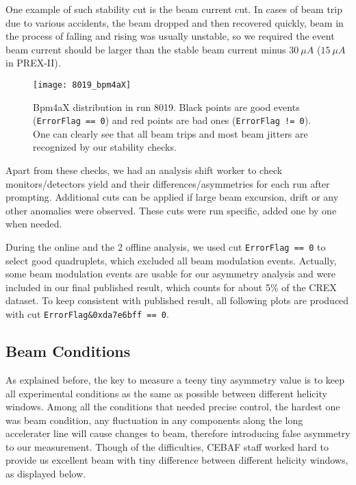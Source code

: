 One example of such stability cut is the beam current cut. In cases of beam trip
due to various accidents, the beam dropped and then recovered quickly, beam in
the process of falling and rising was usually unstable, so we required the event
beam current should be larger than the stable beam current minus $30\ \mu A$ ($15\ \mu A$ in PREX-II).

\begin{figure}[!h]
    \centering
    \texttt{[image: 8019\_bpm4aX]}
    \caption{Bpm4aX distribution in run 8019. Black points are good
    events (\texttt{ErrorFlag == 0}) and red points are bad ones (\texttt{ErrorFlag != 0}). 
    One can clearly see that all beam trips and most beam jitters are recognized 
    by our stability checks.}
\end{figure}

Apart from these checks, we had an analysis shift worker to check monitors/detectors 
yield and their differences/asymmetries for each run after prompting. Additional
cuts can be applied if large beam excursion, drift or any other anomalies were observed. 
These cuts were run specific, added one by one when needed.

During the online and the 2 offline analysis, we used cut \verb|ErrorFlag == 0|
to select good quadruplets, which excluded all beam modulation events. Actually, 
some beam modulation events are usable for our asymmetry analysis and were 
included in our final published result, which counts for about 5\% of the CREX dataset.
To keep consistent with published result, all following plots are produced with cut 
\verb|ErrorFlag&0xda7e6bff == 0|. 

\subsection{Beam Conditions}
As explained before, the key to measure a teeny tiny asymmetry value is to 
keep all experimental conditions as the same as possible between different 
helicity windows. Among all the conditions that needed precise control, the 
hardest one was beam condition, any fluctuation in any components along the 
long accelerater line will cause changes to beam, therefore introducing false 
asymmetry to our measurement. Though of the difficulties, CEBAF staff worked 
hard to provide us excellent beam with tiny difference between different helicity 
windows, as displayed below.

